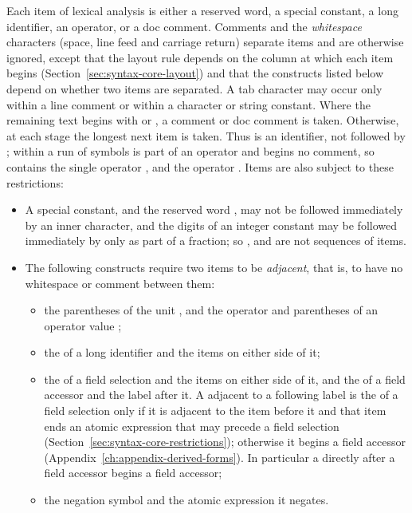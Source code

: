 Each item of lexical analysis is either a reserved word, a special constant, a
long identifier, an operator, or a doc comment. Comments and the
\emph{whitespace} characters (space, line feed and carriage return) separate
items and are otherwise ignored, except that the layout rule depends on the
column at which each item begins (Section~\ref{sec:syntax-core-layout}) and
that the constructs listed below depend on whether two items are separated. A
tab character may occur only within a line comment or within a character or
string constant. Where the remaining text begins with \kw{-{}-} or \kw{\kwlb-},
a comment or doc comment is taken. Otherwise, at each stage the longest next
item is taken.
Thus  is an identifier, not  followed by ; within a
run of symbols \kw{-{}-} is part of an operator and begins no comment, so
 contains the single operator \kw{*-}, and 
the operator \kw{\textasciicircum-}. Items are also subject to these
restrictions:
\begin{itemize}
\item{} A special constant, and the reserved word \kw{\_}, may not be followed
  immediately by an inner character, and the digits of an integer constant may
  be followed immediately by  only as part of a fraction; so ,
   and  are not sequences of items.
\item{} The following constructs require two items to be \emph{adjacent}, that is, to
  have no whitespace or comment between them:
  \begin{itemize}
  \item the parentheses of the unit \kw{()}, and the operator and parentheses of
    an operator value \kw{(}\opv\kw{)};
  \item the  of a long identifier and the items on either side of it;
  \item the  of a field selection \atexp{}\lab{} and the items on
    either side of it, and the  of a field accessor \lab{} and the
    label after it. A  adjacent to a following label is the  of a
    field selection only if it is adjacent to the item before it and that item
    ends an atomic expression that may precede a field selection
    (Section~\ref{sec:syntax-core-restrictions}); otherwise it begins a field
    accessor (Appendix~\ref{ch:appendix-derived-forms}). In particular a 
    directly after a field accessor begins a field accessor;
  \item the negation symbol and the atomic expression it negates.
  \end{itemize}
\end{itemize}
